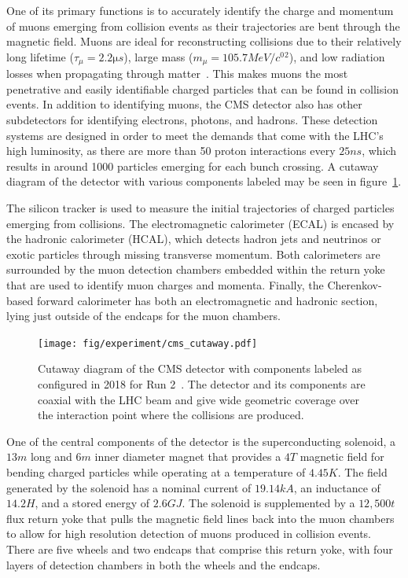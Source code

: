 One of its primary functions is to accurately identify the charge and momentum of muons emerging from collision events as their trajectories are bent through the magnetic field.
Muons are ideal for reconstructing collisions due to their relatively long lifetime ($\tau_\mu=2.2\unit{\micro s}$), large mass ($m_\mu=105.7\unit{MeV/\clight^2}$), and low radiation losses when propagating through matter~\cite{peskin2019}.
This makes muons the most penetrative and easily identifiable charged particles that can be found in collision events.
In addition to identifying muons, the CMS detector also has other subdetectors for identifying electrons, photons, and hadrons.
These detection systems are designed in order to meet the demands that come with the LHC's high luminosity, as there are more than 50 proton interactions every $25\unit{ns}$, which results in around 1000 particles emerging for each bunch crossing.
A cutaway diagram of the detector with various components labeled may be seen in figure~\ref{fig:CMScut}.

The silicon tracker is used to measure the initial trajectories of charged particles emerging from collisions.
The electromagnetic calorimeter (ECAL) is encased by the hadronic calorimeter (HCAL), which detects hadron jets and neutrinos or exotic particles through missing transverse momentum.
Both calorimeters are surrounded by the muon detection chambers embedded within the return yoke that are used to identify muon charges and momenta.
Finally, the Cherenkov-based forward calorimeter has both an electromagnetic and hadronic section, lying just outside of the endcaps for the muon chambers.

\begin{figure}[htbp]
  \centering
  \texttt{[image: fig/experiment/cms\_cutaway.pdf]}
  \caption[
    Cutaway diagram of the CMS detector with components labeled as configured in 2018 for Run 2.
    The detector and its components are coaxial with the LHC beam and give wide geometric coverage over the interaction point where the collisions are produced.
  ]{
    Cutaway diagram of the CMS detector with components labeled as configured in 2018 for Run 2~\cite{Sakuma:2665537}.
    The detector and its components are coaxial with the LHC beam and give wide geometric coverage over the interaction point where the collisions are produced.
  }
  \label{fig:CMScut}
\end{figure}

One of the central components of the detector is the superconducting solenoid, a $13\unit{m}$ long and $6\unit{m}$ inner diameter magnet that provides a $4\unit{T}$ magnetic field for bending charged particles while operating at a temperature of $4.45\unit{K}$.
The field generated by the solenoid has a nominal current of $19.14\unit{kA}$, an inductance of $14.2\unit{H}$, and a stored energy of $2.6\unit{GJ}$.
The solenoid is supplemented by a $12,500\unit{t}$ flux return yoke that pulls the magnetic field lines back into the muon chambers to allow for high resolution detection of muons produced in collision events.
There are five wheels and two endcaps that comprise this return yoke, with four layers of detection chambers in both the wheels and the endcaps.


